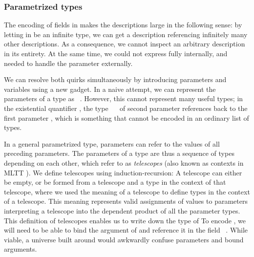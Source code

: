 \subsubsection{Parametrized types}\label{ssec:background-par}
The encoding of fields in  makes the descriptions large in the following sense: by letting  in  be an infinite type, we can get a description referencing infinitely many other descriptions. As a consequence, we cannot inspect an arbitrary description in its entirety. At the same time, we could not express  fully internally, and needed to handle the parameter externally. 

We can resolve both quirks simultaneously by introducing parameters and variables using a new gadget. In a naive attempt, we can represent the parameters of a type as \ . However, this cannot represent many useful types; in the existential quantifier , the type \ \  of second parameter  references back to the first parameter , which is something that cannot be encoded in an ordinary list of types.

In a general parametrized type, parameters can refer to the values of all preceding parameters. The parameters of a type are thus a sequence of types depending on each other, which refer to as \emph{telescopes} \cite{telescopes} (also known as contexts in MLTT \cite{mltt}). We define telescopes using induction-recursion:
A telescope can either be empty, or be formed from a telescope and a type in the context of that telescope, where we used the meaning of a telescope  to define types in the context of a telescope. This meaning represents valid assignments of values to parameters
interpreting a telescope into the dependent product of all the parameter types. This definition of telescopes enables us to write down the type of 
To encode , we will need to be able to bind the argument  of  and reference it in the field \ . While viable, a universe built around  would awkwardly confuse parameters and bound arguments.

